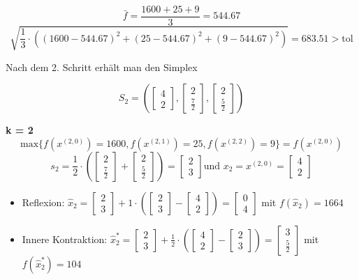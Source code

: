 \documentclass[a4paper, 12pt]{report}
\begin{document}
$$\bar f = \frac{1600+25+9}{3} = 544.67$$
$$\sqrt{\frac{1}{3}\cdot \left((1600 - 544.67)^2 + (25 - 544.67)^2 + (9 - 544.67)^2\right)} = 683.51 > \text{tol}$$

Nach dem 2. Schritt erhält man den Simplex

$$S_2 = \left(\begin{bmatrix}4\\2\end{bmatrix}, \begin{bmatrix}2\\\frac{7}{2}\end{bmatrix}, \begin{bmatrix}2\\\frac{5}{2}\end{bmatrix}\right)$$

\textbf{k = 2}\\
$$\text{max}\{f(x^{(2,0)}) = 1600, f(x^{(2,1)}) = 25, f(x^{(2,2)}) = 9\} = f(x^{(2,0)})$$
$$s_2 = \frac{1}{2}\cdot\left(\begin{bmatrix}2\\\frac{7}{2}\end{bmatrix} + \begin{bmatrix}2\\\frac{5}{2}\end{bmatrix}\right) = \begin{bmatrix}2\\3\end{bmatrix} \text{und } x_2 = x^{(2,0)} = \begin{bmatrix}4\\2\end{bmatrix}$$
\begin{itemize}
\item Reflexion: $\hat x_2 = \begin{bmatrix}2\\3\end{bmatrix} + 1\cdot\left(\begin{bmatrix}2\\3\end{bmatrix} - \begin{bmatrix}4\\2\end{bmatrix}\right) = \begin{bmatrix}0\\4\end{bmatrix}$ mit $f(\hat x_2) = 1664$
\item Innere Kontraktion: $\hat x_2^* = \begin{bmatrix}2\\3\end{bmatrix} + \frac{1}{2}\cdot\left(\begin{bmatrix}4\\2\end{bmatrix} - \begin{bmatrix}2\\3\end{bmatrix}\right) = \begin{bmatrix}3\\\frac{5}{2}\end{bmatrix}$ mit $f(\hat x_2^*) = 104$
\end{itemize}
\end{document}
